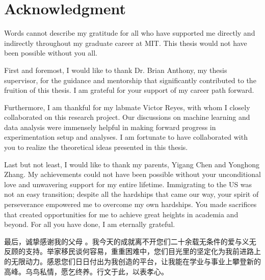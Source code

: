% 

\cleardoublepage

\section*{Acknowledgment}

Words cannot describe my gratitude for all who have supported me directly and indirectly throughout my graduate career at MIT. This thesis would not have been possible without you all. 

First and foremost, I would like to thank Dr. Brian Anthony, my thesis supervisor, for the guidance and mentorship that significantly contributed to the fruition of this thesis. I am grateful for your support of my career path forward. 

Furthermore, I am thankful for my labmate Victor Reyes, with whom I closely collaborated on this research project. Our discussions on machine learning and data analysis were immensely helpful in making forward progress in experimentation setup and analyses. I am fortunate to have collaborated with you to realize the theoretical ideas presented in this thesis. 

Last but not least, I would like to thank my parents, Yigang Chen and Yonghong Zhang. My achievements could not have been possible without your unconditional love and unwavering support for my entire lifetime. Immigrating to the US was not an easy transition; despite all the hardships that came our way, your spirit of perseverance empowered me to overcome my own hardships. You made sacrifices that created opportunities for me to achieve great heights in academia and beyond. For all you have done, I am eternally grateful.


\begin{CJK*}{UTF8}{gbsn} %
最后，诚挚感谢我的父母%
。我今天的成就离不开您们二十余载无条件的爱与义无反顾的支持。举家移民谈何容易，重重困难中，您们目光里的坚定化为我前进路上的无限动力。感恩您们日日付出为我创造的平台，让我能在学业与事业上攀登新的高峰。乌鸟私情，愿乞终养。行文于此，以表孝心。
\end{CJK*}



